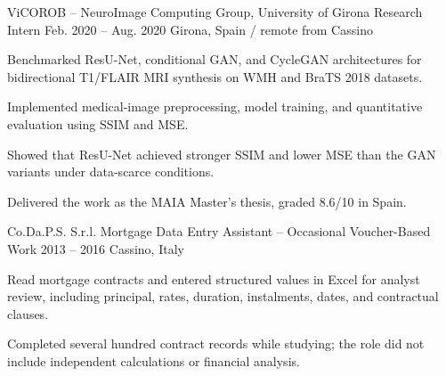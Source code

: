 \begin{cventries}
\cventry
  {ViCOROB -- NeuroImage Computing Group, University of Girona}
  {Research Intern}
  {Feb. 2020 -- Aug. 2020}
  {Girona, Spain / remote from Cassino}
  {
    \begin{cvitems}
      \item {Benchmarked ResU-Net, conditional GAN, and CycleGAN architectures for bidirectional T1/FLAIR MRI synthesis on WMH and BraTS 2018 datasets.}
      \item {Implemented medical-image preprocessing, model training, and quantitative evaluation using SSIM and MSE.}
      \item {Showed that ResU-Net achieved stronger SSIM and lower MSE than the GAN variants under data-scarce conditions.}
      \item {Delivered the work as the MAIA Master's thesis, graded 8.6/10 in Spain.}
    \end{cvitems}
  }

\cventry
  {Co.Da.P.S. S.r.l.}
  {Mortgage Data Entry Assistant -- Occasional Voucher-Based Work}
  {2013 -- 2016}
  {Cassino, Italy}
  {
    \begin{cvitems}
      \item {Read mortgage contracts and entered structured values in Excel for analyst review, including principal, rates, duration, instalments, dates, and contractual clauses.}
      \item {Completed several hundred contract records while studying; the role did not include independent calculations or financial analysis.}
    \end{cvitems}
  }
\end{cventries}
